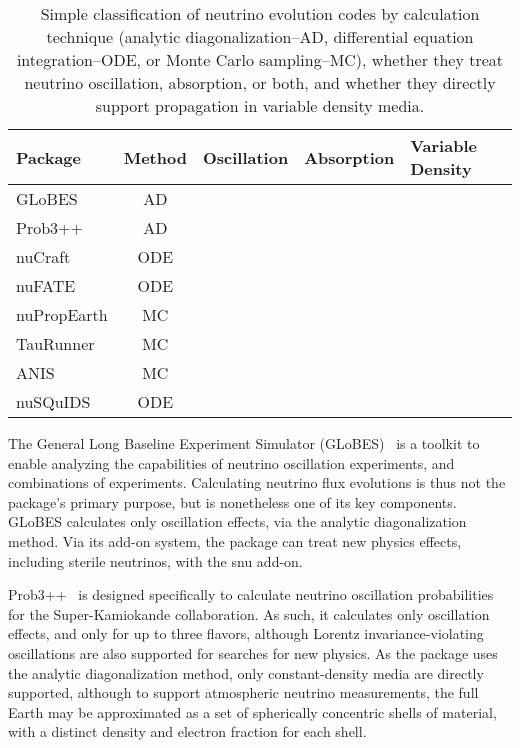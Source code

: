 \documentclass[3p,12pt]{elsarticle}
\newcommand{\ttf}{\ttfamily}
\begin{document}
\begin{table}
	\centering
	\begin{tabular}{l | c | c | c | C{5em}}
		\textbf{Package} & \textbf{Method} & \textbf{Oscillation} & \textbf{Absorption} & \textbf{Variable Density}\\
		\hline
    		GLoBES & AD & \checkmark & ~ & ~\\
    		Prob3++ & AD & \checkmark & ~ & ~\\
    		nuCraft & ODE & \checkmark & ~ & \checkmark\\
    		nuFATE & ODE & ~ & \checkmark & \checkmark\\
    		nuPropEarth & MC & ~ & \checkmark & \checkmark\\
    		TauRunner & MC & ~ & \checkmark & \checkmark\\
    		ANIS & MC & ~ & \checkmark & \checkmark\\
    		nuSQuIDS & ODE & \checkmark & \checkmark & \checkmark\\
	\end{tabular}
	\caption{Simple classification of neutrino evolution codes by calculation technique (analytic diagonalization--AD, differential equation integration--ODE, or Monte Carlo sampling--MC), whether they treat neutrino oscillation, absorption, or both, and whether they directly support propagation in variable density media.}
\end{table}

The General Long Baseline Experiment Simulator (GLoBES)~\cite{Huber:2007ji} is a toolkit to enable analyzing the capabilities of neutrino oscillation experiments, and combinations of experiments. 
Calculating neutrino flux evolutions is thus not the package's primary purpose, but is nonetheless one of its key components. 
GLoBES calculates only oscillation effects, via the analytic diagonalization method. 
Via its add-on system, the package can treat new physics effects, including sterile neutrinos, with the {\ttf snu} add-on. 

Prob3++~\cite{prob3pp} is designed specifically to calculate neutrino oscillation probabilities for the Super-Kamiokande collaboration. 
As such, it calculates only oscillation effects, and only for up to three flavors, although Lorentz invariance-violating oscillations are also supported for searches for new physics. 
As the package uses the analytic diagonalization method, only constant-density media are directly supported, although to support atmospheric neutrino measurements, the full Earth may be approximated as a set of spherically concentric shells of material, with a distinct density and electron fraction for each shell. 
\end{document}

